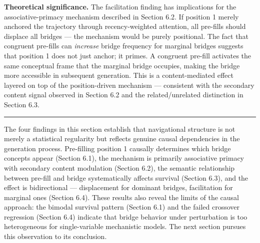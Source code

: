 \textbf{Theoretical significance.} The facilitation finding has implications for the associative-primacy mechanism described in Section 6.2. If position 1 merely anchored the trajectory through recency-weighted attention, all pre-fills should displace all bridges --- the mechanism would be purely positional. The fact that congruent pre-fills can \emph{increase} bridge frequency for marginal bridges suggests that position 1 does not just anchor; it primes. A congruent pre-fill activates the same conceptual frame that the marginal bridge occupies, making the bridge more accessible in subsequent generation. This is a content-mediated effect layered on top of the position-driven mechanism --- consistent with the secondary content signal observed in Section 6.2 and the related/unrelated distinction in Section 6.3.

\begin{center}\rule{0.5\linewidth}{0.5pt}\end{center}

The four findings in this section establish that navigational structure is not merely a statistical regularity but reflects genuine causal dependencies in the generation process. Pre-filling position 1 causally determines which bridge concepts appear (Section 6.1), the mechanism is primarily associative primacy with secondary content modulation (Section 6.2), the semantic relationship between pre-fill and bridge systematically affects survival (Section 6.3), and the effect is bidirectional --- displacement for dominant bridges, facilitation for marginal ones (Section 6.4). These results also reveal the limits of the causal approach: the bimodal survival pattern (Section 6.1) and the failed crossover regression (Section 6.4) indicate that bridge behavior under perturbation is too heterogeneous for single-variable mechanistic models. The next section pursues this observation to its conclusion.
